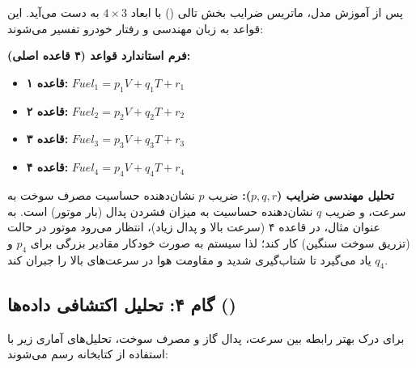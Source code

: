\documentclass{article}
\begin{document}
پس از آموزش مدل، ماتریس ضرایب بخش تالی () با ابعاد $4 \times 3$ به دست می‌آید. این قواعد به زبان مهندسی و رفتار خودرو تفسیر می‌شوند:

\begin{tcolorbox}[
	colback=lightmutedpeach,
	colframe=mutedpeach,
	title=تفسیر قواعد استخراج‌شده,
	coltitle=white,
	arc=3mm
	]
	\textbf{فرم استاندارد قواعد (۴ قاعده اصلی):}
	\begin{itemize}
		\item \textbf{قاعده ۱:}  $Fuel_1 = p_1 V + q_1 T + r_1$
		\item \textbf{قاعده ۲:}  $Fuel_2 = p_2 V + q_2 T + r_2$
		\item \textbf{قاعده ۳:}  $Fuel_3 = p_3 V + q_3 T + r_3$
		\item \textbf{قاعده ۴:}  $Fuel_4 = p_4 V + q_4 T + r_4$
	\end{itemize}
	
	\textbf{تحلیل مهندسی ضرایب ($p, q, r$):}
	ضریب $p$ نشان‌دهنده حساسیت مصرف سوخت به سرعت، و ضریب $q$ نشان‌دهنده حساسیت به میزان فشردن پدال (بار موتور) است. به عنوان مثال، در قاعده ۴ (سرعت بالا و پدال زیاد)، انتظار می‌رود موتور در حالت  (تزریق سوخت سنگین) کار کند؛ لذا سیستم  به صورت خودکار مقادیر بزرگی برای $p_4$ و $q_4$ یاد می‌گیرد تا شتاب‌گیری شدید و مقاومت هوا در سرعت‌های بالا را جبران کند.
\end{tcolorbox}

\subsection{گام ۴: تحلیل اکتشافی داده‌ها ()}

برای درک بهتر رابطه بین سرعت، پدال گاز و مصرف سوخت، تحلیل‌های آماری زیر با استفاده از کتابخانه  رسم می‌شوند:
\end{document}

